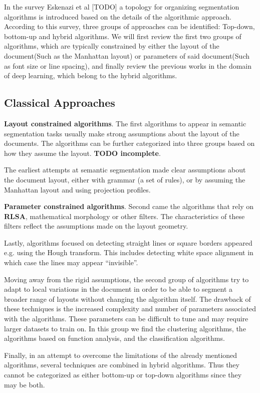 \documentclass[english, bibtex]{kththesis}
\begin{document}
In the survey Eskenazi et al [TODO] a topology for organizing segmentation algorithms is introduced based on the details of the algorithmic approach. According to this survey, three groups of approaches can be identified: Top-down, bottom-up and hybrid algorithms. We will first review the first two groups of algorithms, which are typically constrained by either the layout of the document(Such as the Manhattan layout) or parameters of said document(Such as font size or line spacing), and finally review the previous works in the domain of deep learning, which belong to the hybrid algorithms.

\subsection{Classical Approaches}

\textbf{Layout constrained algorithms}. The first algorithms to appear in semantic segmentation tasks usually make strong assumptions about the layout of the documents. The algorithms can be further categorized into three groups based on how they assume the layout. \textbf{TODO incomplete}.

The earliest attempts at semantic segmentation made clear assumptions about the document layout, either with grammar (a set of rules), or by assuming the Manhattan layout and using projection profiles.
    
\textbf{Parameter constrained algorithms}. Second came the algorithms that rely on \textbf{RLSA}, mathematical morphology or other filters. The characteristics of these filters reflect the assumptions made on the layout geometry. 
    
Lastly, algorithms focused on detecting straight lines or square borders appeared e.g. using the Hough transform. This includes detecting white space alignment in which case the lines may appear “invisible”.
    
Moving away from the rigid assumptions, the second group of algorithms try to adapt to local variations in the document in order to be able to segment a broader range of layouts without changing the algorithm itself. The drawback of these techniques is the increased complexity and number of parameters associated with the algorithms. These parameters can be difficult to tune and may require larger datasets to train on. In this group we find the clustering algorithms, the algorithms based on function analysis, and the classification algorithms. 

Finally, in an attempt to overcome the limitations of the already mentioned algorithms, several techniques are combined in hybrid algorithms. Thus they cannot be categorized as either bottom-up or top-down algorithms since they may be both.  
\end{document}
